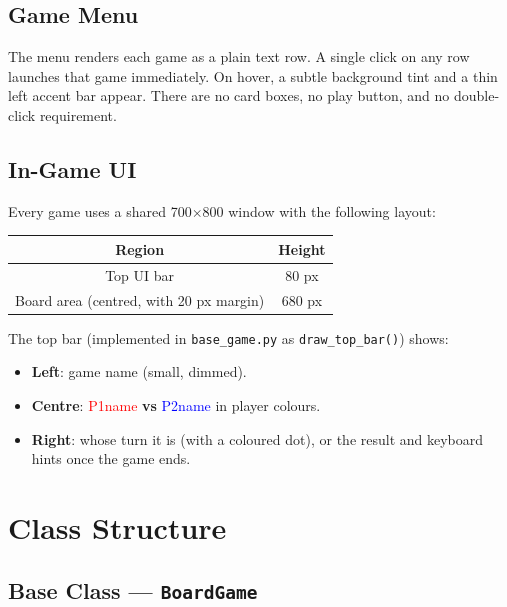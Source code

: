\documentclass[12pt, letterpaper]{article}
\begin{document}
\subsection{Game Menu}

The menu renders each game as a plain text row. A single click on any row
launches that game immediately. On hover, a subtle background tint and a thin
left accent bar appear. There are no card boxes, no play button, and no
double-click requirement.

\subsection{In-Game UI}

Every game uses a shared 700$\times$800 window with the following layout:

\begin{center}
\begin{tabular}{|c|c|}
\hline
\textbf{Region} & \textbf{Height} \\
\hline
Top UI bar & 80 px \\
\hline
Board area (centred, with 20 px margin) & 680 px \\
\hline
\end{tabular}
\end{center}

The top bar (implemented in \texttt{base\_game.py} as \texttt{draw\_top\_bar()})
shows:
\begin{itemize}
    \item \textbf{Left}: game name (small, dimmed).
    \item \textbf{Centre}: \textcolor{red}{P1name} \textbf{vs}
          \textcolor{blue}{P2name} in player colours.
    \item \textbf{Right}: whose turn it is (with a coloured dot), or the
          result and keyboard hints once the game ends.
\end{itemize}

\section{Class Structure}

\subsection{Base Class --- \texttt{BoardGame}}
\end{document}
